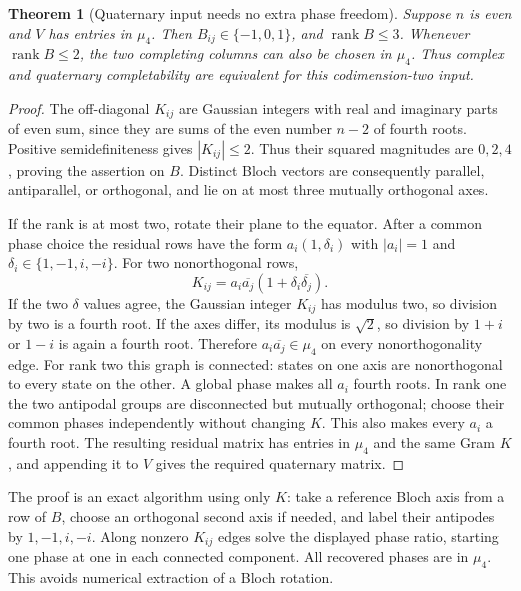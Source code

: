 \documentclass[11pt]{article}
\newtheorem{theorem}{Theorem}[section]
\begin{document}
\begin{theorem}[Quaternary input needs no extra phase freedom]
Suppose $n$ is even and $V$ has entries in $\mu_4$.
Then $B_{ij}\in\{-1,0,1\}$, and $\operatorname{rank}B\le3$.
Whenever $\operatorname{rank}B\le2$, the two completing columns
can also be chosen in $\mu_4$. Thus complex and quaternary
completability are equivalent for this codimension-two input.
\end{theorem}
\begin{proof}
The off-diagonal $K_{ij}$ are Gaussian integers with real and
imaginary parts of even sum, since they are sums of the even number
$n-2$ of fourth roots. Positive semidefiniteness gives $|K_{ij}|\le2$.
Thus their squared magnitudes are $0,2,4$, proving the assertion on
$B$. Distinct Bloch vectors are consequently parallel, antiparallel,
or orthogonal, and lie on at most three mutually orthogonal axes.

If the rank is at most two, rotate their plane to the equator.
After a common phase choice the residual rows have the form
$a_i(1,\delta_i)$ with $|a_i|=1$ and
$\delta_i\in\{1,-1,i,-i\}$. For two nonorthogonal rows,
\[
 K_{ij}=a_i\overline{a_j}(1+\delta_i\overline{\delta_j}).
\]
If the two $\delta$ values agree, the Gaussian integer $K_{ij}$
has modulus two, so division by two is a fourth root. If the axes
differ, its modulus is $\sqrt2$, so division by $1+i$ or $1-i$
is again a fourth root. Therefore $a_i\overline{a_j}\in\mu_4$
on every nonorthogonality edge. For rank two this graph is connected:
states on one axis are nonorthogonal to every state on the other.
A global phase makes all $a_i$ fourth roots. In rank one the two
antipodal groups are disconnected but mutually orthogonal; choose
their common phases independently without changing $K$.
This also makes every $a_i$ a fourth root. The resulting residual
matrix has entries in $\mu_4$ and the same Gram $K$, and appending
it to $V$ gives the required quaternary matrix.
\end{proof}
The proof is an exact algorithm using only $K$: take a reference
Bloch axis from a row of $B$, choose an orthogonal second axis if
needed, and label their antipodes by $1,-1,i,-i$. Along nonzero
$K_{ij}$ edges solve the displayed phase ratio, starting one phase
at one in each connected component. All recovered phases are in
$\mu_4$. This avoids numerical extraction of a Bloch rotation.
\end{document}
